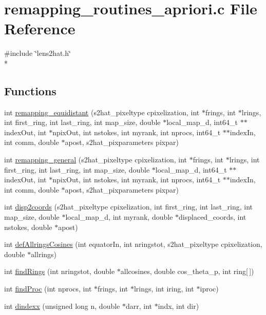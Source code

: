 \section{remapping\-\_\-routines\-\_\-apriori.\-c File Reference}
\label{remapping__routines__apriori_8c}
{\ttfamily \#include \char`\"{}lens2hat.\-h\char`\"{}}\\*
\subsection*{Functions}
\begin{DoxyCompactItemize}
\item 
int \hyperlink{remapping__routines__apriori_8c_af60485d69bc1372bb232e8565b657ab5}{remapping\-\_\-equidistant} (s2hat\-\_\-pixeltype cpixelization, int $\ast$frings, int $\ast$lrings, int first\-\_\-ring, int last\-\_\-ring, int map\-\_\-size, double $\ast$local\-\_\-map\-\_\-d, int64\-\_\-t $\ast$$\ast$index\-Out, int $\ast$npix\-Out, int nstokes, int myrank, int nprocs, int64\-\_\-t $\ast$$\ast$index\-In, int comm, double $\ast$apost, s2hat\-\_\-pixparameters pixpar)
\item 
int \hyperlink{remapping__routines__apriori_8c_ae2ea064540d0d53fdb9c99c0ac8b2767}{remapping\-\_\-general} (s2hat\-\_\-pixeltype cpixelization, int $\ast$frings, int $\ast$lrings, int first\-\_\-ring, int last\-\_\-ring, int map\-\_\-size, double $\ast$local\-\_\-map\-\_\-d, int64\-\_\-t $\ast$$\ast$index\-Out, int $\ast$npix\-Out, int nstokes, int myrank, int nprocs, int64\-\_\-t $\ast$$\ast$index\-In, int comm, double $\ast$apost, s2hat\-\_\-pixparameters pixpar)
\item 
int \hyperlink{remapping__routines__apriori_8c_aa6fe78003a5ddfd2d35039aa05d6913c}{disp2coords} (s2hat\-\_\-pixeltype cpixelization, int first\-\_\-ring, int last\-\_\-ring, int map\-\_\-size, double $\ast$local\-\_\-map\-\_\-d, int myrank, double $\ast$displaced\-\_\-coords, int nstokes, double $\ast$apost)
\item 
int \hyperlink{remapping__routines__apriori_8c_af6cfda4741a11339b5a1d9c599411b87}{def\-Allrings\-Cosines} (int equator\-In, int nringstot, s2hat\-\_\-pixeltype cpixelization, double $\ast$allrings)
\item 
int \hyperlink{remapping__routines__apriori_8c_a95c082e86d6e644f4789485021f90235}{find\-Rings} (int nringstot, double $\ast$allcosines, double cos\-\_\-theta\-\_\-p, int ring\mbox{[}$\,$\mbox{]})
\item 
int \hyperlink{remapping__routines__apriori_8c_af4ba917a5b9f32394911c8d28d6c2d07}{find\-Proc} (int nprocs, int $\ast$frings, int $\ast$lrings, int iring, int $\ast$iproc)
\item 
int \hyperlink{remapping__routines__apriori_8c_ad574f0dfca1f8db2b630a9b6cf3a45c9}{dindexx} (unsigned long n, double $\ast$darr, int $\ast$indx, int dir)
\end{DoxyCompactItemize}


